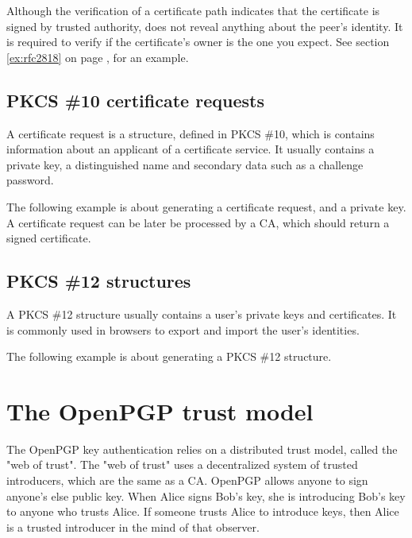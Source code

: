 \par
Although the verification of a certificate path indicates that the
certificate is signed by trusted authority, does not reveal anything
about the peer's identity. It is required to verify if the certificate's
owner is the one you expect. See section \ref{ex:rfc2818} on page \pageref{ex:rfc2818},
for an example.


\subsection{PKCS \#10 certificate requests}
A certificate request is a structure, defined in PKCS \#10, which
is contains information about an applicant of a certificate service.
It usually contains a private key, a distinguished name and secondary
data such as a challenge password.
\par
The following example is about generating a certificate request, and
a private key. A certificate request can be later be processed by a CA,
which should return a signed certificate.



\subsection{PKCS \#12 structures}
A PKCS \#12 structure usually contains a user's private keys and
certificates. It is commonly used in browsers to export and import
the user's identities.

\par
The following example is about generating a PKCS \#12 structure.




\section{The OpenPGP trust model}
\label{pgp:trust}

The OpenPGP key authentication relies on a distributed trust model, called
the "web of trust". The "web of trust" uses a decentralized system of 
trusted introducers, which are the same as a CA. OpenPGP allows anyone to 
sign anyone's else public key. When Alice signs Bob's key, she is introducing 
Bob's key to anyone who trusts Alice. If someone trusts Alice to introduce
keys, then Alice is a trusted introducer in the mind of that observer.

